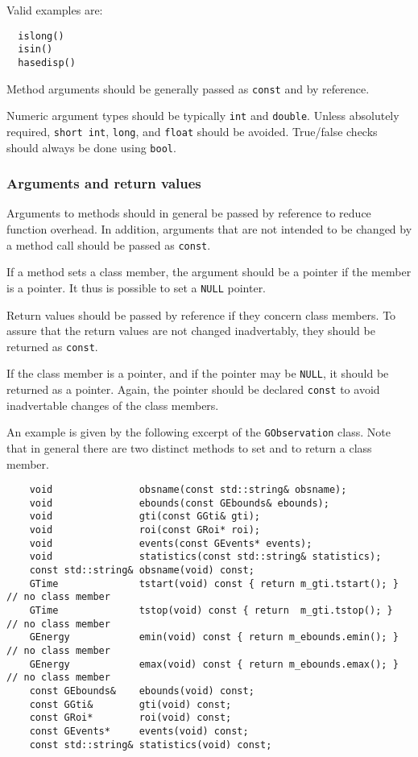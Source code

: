 \documentclass{article}[12pt,a4]
\begin{document}
Valid examples are:
\begin{verbatim}
  islong()
  isin()
  hasedisp()
\end{verbatim}

Method arguments should be generally passed as {\tt const} and by reference.

Numeric argument types should be typically {\tt int} and {\tt double}.
Unless absolutely required, {\tt short int}, {\tt long}, and {\tt float} should be avoided.
True/false checks should always be done using {\tt bool}.


\subsubsection{Arguments and return values}

Arguments to methods should in general be passed by reference to reduce function
overhead.
In addition, arguments that are not intended to be changed by a method call should
be passed as {\tt const}.

If a method sets a class member, the argument should be a pointer if the member
is a pointer.
It thus is possible to set a {\tt NULL} pointer.

Return values should be passed by reference if they concern class members.
To assure that the return values are not changed inadvertably, they should be returned
as {\tt const}.

If the class member is a pointer, and if the pointer may be {\tt NULL}, it should be
returned as a pointer.
Again, the pointer should be declared {\tt const} to avoid inadvertable changes of
the class members.

An example is given by the following excerpt of the {\tt GObservation} class.
Note that in general there are two distinct methods to set and to return a
class member.
\begin{verbatim}
    void               obsname(const std::string& obsname);
    void               ebounds(const GEbounds& ebounds);
    void               gti(const GGti& gti);
    void               roi(const GRoi* roi);
    void               events(const GEvents* events);
    void               statistics(const std::string& statistics);
    const std::string& obsname(void) const;
    GTime              tstart(void) const { return m_gti.tstart(); }  // no class member
    GTime              tstop(void) const { return  m_gti.tstop(); }   // no class member
    GEnergy            emin(void) const { return m_ebounds.emin(); }  // no class member
    GEnergy            emax(void) const { return m_ebounds.emax(); }  // no class member
    const GEbounds&    ebounds(void) const;
    const GGti&        gti(void) const;
    const GRoi*        roi(void) const;
    const GEvents*     events(void) const;
    const std::string& statistics(void) const;
\end{verbatim}
\end{document}
